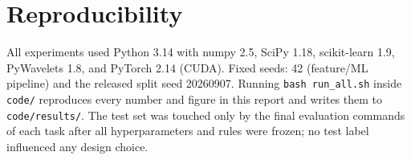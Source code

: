 \documentclass[11pt]{article}
\begin{document}


\section{Reproducibility}

All experiments used Python 3.14 with numpy 2.5, SciPy 1.18,
scikit-learn 1.9, PyWavelets 1.8, and PyTorch 2.14 (CUDA). Fixed seeds: 42
(feature/ML pipeline) and the released split seed 20260907. Running
\texttt{bash run\_all.sh} inside \texttt{code/} reproduces every number and
figure in this report and writes them to \texttt{code/results/}. The test
set was touched only by the final evaluation commands of each task after all
hyperparameters and rules were frozen; no test label influenced any design
choice.
\end{document}
